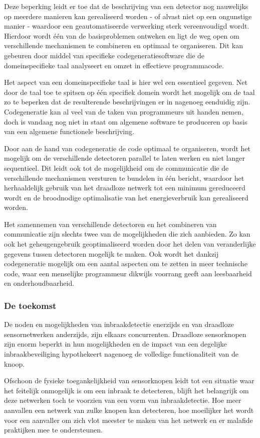 \documentclass[DIV=calc,paper=a4,fontsize=11pt,twocolumn,draft]{scrartcl}
\newcommand{\heading}[1]{
\subsubsection*{#1}
\vspace{-2mm}
}
\begin{document}
Deze beperking leidt er toe dat de beschrijving van een detector nog nauwelijks
op meerdere manieren kan gerealiseerd worden - of alvast niet op een ongunstige
manier - waardoor een geautomatiseerde verwerking sterk vereenvoudigd wordt.
Hierdoor wordt \'e\'en van de basisproblemen ontweken en ligt de weg open om
verschillende mechanismen te combineren en optimaal te organiseren. Dit kan
gebeuren door middel van specifieke codegeneratiesoftware die de
domeinspecifieke taal analyseert en omzet in effectieve programmacode.

Het aspect van een domeinspecifieke taal is hier wel een essentieel gegeven.
Net door de taal toe te spitsen op \'e\'en specifiek domein wordt het mogelijk
om de taal zo te beperken dat de resulterende beschrijvingen er in nagenoeg
eenduidig zijn. Codegeneratie kan al veel van de taken van programmeurs uit
handen nemen, doch is vandaag nog niet in staat om algemene software te
produceren op basis van een algemene functionele beschrijving.

Door aan de hand van codegeneratie de code optimaal te organiseren, wordt het
mogelijk om de verschillende detectoren parallel te laten werken en niet langer
sequentieel. Dit leidt ook tot de mogelijkheid om de communicatie die de
verschillende mechanismen versturen te bundelen in \'e\'en bericht, waardoor
het herhaaldelijk gebruik van het draadloze netwerk tot een minimum gereduceerd
wordt en de broodnodige optimalisatie van het energieverbruik kan gerealiseerd
worden.

Het samennemen van verschillende detectoren en het combineren van communicatie
zijn slechts twee van de mogelijkheden die zich aanbieden. Zo kan ook het
geheugengebruik geoptimaliseerd worden door het delen van veranderlijke
gegevens tussen detectoren mogelijk te maken. Ook wordt het dankzij
codegeneratie mogelijk om een aantal aspecten om te zetten in meer technische
code, waar een menselijke programmeur dikwijls voorrang geeft aan leesbaarheid
en onderhoudbaarheid.

\heading{De toekomst}

De noden en mogelijkheden van inbraakdetectie enerzijds en van draadloze
sensornetwerken anderzijds, zijn elkaars concurrenten. Draadloze sensorknopen
zijn enorm beperkt in hun mogelijkheden en de impact van een degelijke
inbraakbeveiliging hypothekeert nagenoeg de volledige functionaliteit van de
knoop.

Ofschoon de fysieke toegankelijkheid van sensorknopen leidt tot een situatie
waar het feitelijk onmogelijk is om een inbraak te detecteren, blijft het
belangrijk om deze netwerken toch te voorzien van een vorm van inbraakdetectie.
Hoe meer aanvallen een netwerk van zulke knopen kan detecteren, hoe moeilijker
het wordt voor een aanvaller om zich vlot meester te maken van het netwerk en
er malafide praktijken mee te ondersteunen.
\end{document}
